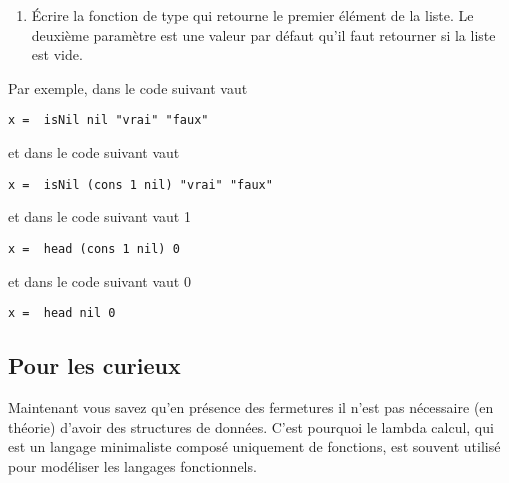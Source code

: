 \begin{Exercise}
\begin{enumerate}
\item Écrire la fonction  de type  qui retourne le premier élément de la liste. Le
  deuxième paramètre est une valeur par défaut qu'il faut retourner si
  la liste est vide.

\end{enumerate}

Par exemple, dans le code suivant  vaut 
\begin{verbatim}
x =  isNil nil "vrai" "faux"
\end{verbatim}
et dans le code suivant  vaut 
\begin{verbatim}
x =  isNil (cons 1 nil) "vrai" "faux"
\end{verbatim}
et dans le code suivant  vaut 1
\begin{verbatim}
x =  head (cons 1 nil) 0
\end{verbatim}
et dans le code suivant  vaut 0
\begin{verbatim}
x =  head nil 0
\end{verbatim}

\subsection*{Pour les curieux}
Maintenant vous savez qu'en présence des fermetures il n'est pas
nécessaire (en théorie) d'avoir des structures de données. C'est
pourquoi le lambda calcul, qui est un langage minimaliste composé
uniquement de fonctions, est souvent utilisé pour modéliser les
langages fonctionnels.
\end{Exercise}

\begin{Answer}[ref={ex:datatype_fermeture}]
\end{Answer}